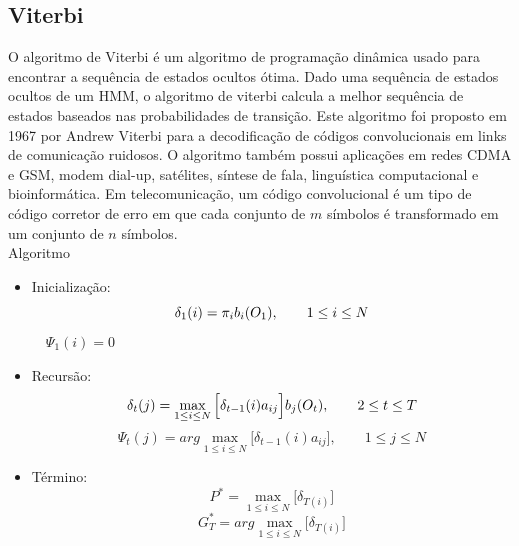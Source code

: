 \subsection{Viterbi}
\label{secViterbi}
O algoritmo de Viterbi é um algoritmo de programação dinâmica usado para encontrar a sequência de estados ocultos ótima. Dado uma sequência de estados ocultos de um HMM, o algoritmo de viterbi calcula a melhor sequência de estados baseados nas probabilidades de transição. Este algoritmo foi proposto em 1967 por Andrew Viterbi para a decodificação de códigos convolucionais em links de comunicação ruidosos.  O algoritmo também possui aplicações  em redes CDMA e GSM, modem dial-up, satélites, síntese de fala, linguística computacional e bioinformática. Em telecomunicação, um código convolucional é um tipo de código corretor de erro em que cada conjunto de $m$ símbolos é transformado em um conjunto de $n$ símbolos.\\
Algoritmo
\begin{itemize}
\item Inicialização:\\
\begin{equation}
\delta_1 (i) = \pi_i b_i (O_1), \qquad 1 \leq i \leq N \\
\end{equation}
$
\quad \Psi_1 (i) = 0
$

\item Recursão:\\
\begin{equation}
\displaystyle \delta_t (j) = \max\limits_{1 \leq i \leq N} \Big[\delta_{t-1}(i) a_{ij} \Big]b_j (O_t), \qquad 2 \leq t \leq T\\
\end{equation}
\begin{equation}
\displaystyle \Psi_t (j) = arg\max\limits_{1 \leq i \leq N}\Big[\delta_{t-1} (i)a_{ij}\Big], \qquad 1\leq j \leq N
\end{equation}

\item Término:\\
\begin{equation}
\displaystyle P^* =\max\limits_{1 \leq i \leq N}  \Big[\delta_{T(i)}\Big] 
\end{equation}
\begin{equation}
\displaystyle G^*_T = arg\max\limits_{1 \leq i \leq N}  \Big[\delta_{T(i)}\Big]
\end{equation}


\end{itemize}





